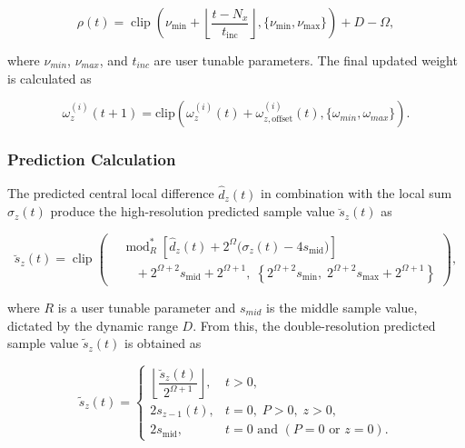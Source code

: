 \begin{equation}
	\rho(t) = \operatorname{clip}\!\left(
	\nu_{\min} +
	\left\lfloor \frac{t - N_x}{t_{\mathrm{inc}}} \right\rfloor,
	\{ \nu_{\min}, \nu_{\max} \}
	\right)
	+ D - \Omega,
	\label{eq:weight-update-scaling-exponent}
\end{equation}

where $\nu_{min}$, $\nu_{max}$, and $t_{inc}$ are user tunable parameters. The final updated weight is calculated as

\begin{equation}
	\omega^{(i)}_z(t + 1) = \text{clip} \left( \omega^{(i)}_z(t) + \omega^{(i)}_{z, \text{offset}}(t), \{ \omega_{min}, \omega_{max} \} \right).
	\label{eq:weight-update}
\end{equation}

\subsubsection{Prediction Calculation}

The predicted central local difference $\hat{d}_z(t)$ in combination with the local sum $\sigma_z(t)$ produce the high-resolution predicted sample value $\breve{s}_z(t)$ as

\begin{equation}
	\breve{s}_z(t) = \operatorname{clip}\!\left(
	\begin{aligned}
			 & \operatorname{mod}_R^* \left[
				\hat{d}_z(t) + 2^{\Omega} \bigl(\sigma_z(t) - 4 s_{\mathrm{mid}}\bigr)
			\right]                                                  \\
			 & \quad + 2^{\Omega+2} s_{\mathrm{mid}} + 2^{\Omega+1},
			\;
			\left\{
			2^{\Omega+2} s_{\min},\;
			2^{\Omega+2} s_{\max} + 2^{\Omega+1}
			\right\}
		\end{aligned}
	\right),
	\label{eq:high-resolution-predicted-sample}
\end{equation}

where $R$ is a user tunable parameter and $s_{mid}$ is the middle sample value, dictated by the dynamic range $D$. From this, the double-resolution predicted sample value $\tilde{s}_z(t)$ is obtained as

\begin{equation}
	\tilde{s}_z(t) =
	\begin{cases}
		\left\lfloor \dfrac{\breve{s}_z(t)}{2^{\Omega+1}} \right\rfloor, & t > 0,                                        \\[8pt]
		2 s_{z-1}(t),                                                    & t = 0,\; P > 0,\; z > 0,                      \\[6pt]
		2 s_{\mathrm{mid}},                                              & t = 0 \text{ and } (P = 0 \text{ or } z = 0).
	\end{cases}
	\label{eq:double-resolution-predicted-sample}
\end{equation}

